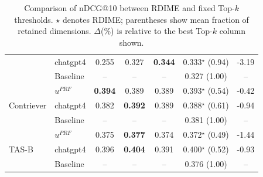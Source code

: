 \begin{table}[t]
{\begin{tabular}{ll|ccccc}
 & chatgpt4 & 0.255 & 0.327 & \textbf{0.344} & 0.333$^\star$ (0.94) & -3.19 \\
 & Baseline & -- & -- & -- & 0.327 (1.00) & -- \\
\midrule
\multirow{3}{*}{Contriever} & $u^{PRF}$ & \textbf{0.394} & 0.389 & 0.389 & 0.393$^\star$ (0.54) & -0.42 \\
 & chatgpt4 & 0.382 & \textbf{0.392} & 0.389 & 0.388$^\star$ (0.61) & -0.94 \\
 & Baseline & -- & -- & -- & 0.381 (1.00) & -- \\
\midrule
\multirow{3}{*}{TAS-B} & $u^{PRF}$ & 0.375 & \textbf{0.377} & 0.374 & 0.372$^\star$ (0.49) & -1.44 \\
 & chatgpt4 & 0.396 & \textbf{0.404} & 0.391 & 0.400$^\star$ (0.52) & -0.93 \\
 & Baseline & -- & -- & -- & 0.376 (1.00) & -- \\
\bottomrule
\end{tabular}
}
\caption{Comparison of nDCG@10 between RDIME and fixed Top-$k$ thresholds. $\star$ denotes RDIME; parentheses show mean fraction of retained dimensions. $\Delta$(\%) is relative to the best Top-$k$ column shown.}
\label{tab:comparison}
\end{table}
